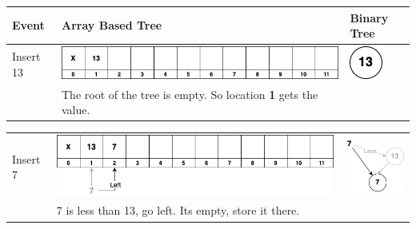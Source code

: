 \begin{center}
\begin{tabular}{|M{0.10\textwidth}|M{0.50\textwidth} M{0.35\textwidth}|}
\hline
\textbf{Event} & \textbf{Array Based Tree} & \textbf{Binary Tree}\\
\hline
Insert 13 & 
\includegraphics[scale=.4]{images/binary_tree_array_01.png} & 
\includegraphics[scale=.4]{images/binary_tree_example_01.png}\\
& \footnotesize{The root of the tree is empty. So location \textbf{1} gets the value.} &   \\
\hline
\end{tabular}
\end{center}
\begin{center}
\begin{tabular}{|M{0.10\textwidth}|M{0.50\textwidth} M{0.35\textwidth}|}
\hline
Insert 7 &
\includegraphics[scale=.4]{images/binary_tree_array_02.png} & 
\includegraphics[scale=.4]{images/binary_tree_example_02.png}\\
& \footnotesize{7 is less than 13, go left. Its empty, store it there.} &   \\
\hline
\end{tabular}
\end{center}
